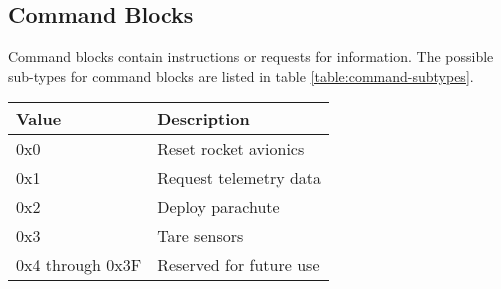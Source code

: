 \subsection{Command Blocks}

Command blocks contain instructions or requests for information. The possible sub-types for command blocks are listed
in table \ref{table:command-subtypes}.

\begin{table*}[htb]
    \centering
    \begin{tabular}{@{}ll@{}}
        \toprule
        Value            & Description             \\
        \midrule
        0x0              & Reset rocket avionics   \\
        0x1              & Request telemetry data  \\
        0x2              & Deploy parachute        \\
        0x3              & Tare sensors            \\
        0x4 through 0x3F & Reserved for future use \\
        \bottomrule
    \end{tabular}
    \caption{Command Block Sub-types}
    \label{table:command-subtypes}
\end{table*}





